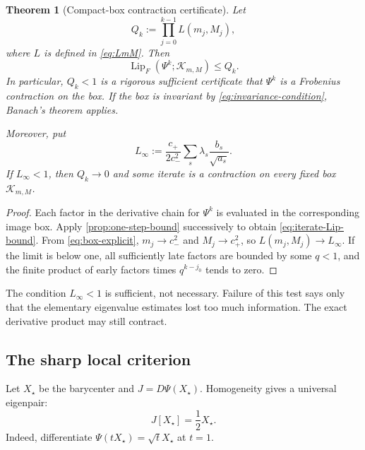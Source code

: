 \documentclass[11pt]{article}
\newtheorem{theorem}{Theorem}[section]
\theoremstyle{definition}
\newcommand{\Lip}{\operatorname{Lip}}
\newcommand{\cK}{\mathcal K}
\begin{document}
\begin{theorem}[Compact-box contraction certificate]\label{thm:compact-certificate}
Let
\begin{equation}\label{eq:Qk}
 Q_k:=\prod_{j=0}^{k-1}L(m_j,M_j),
\end{equation}
where $L$ is defined in \eqref{eq:LmM}.  Then
\begin{equation}\label{eq:iterate-Lip-bound}
 \Lip_F(\Psi^k;\cK_{m,M})\leq Q_k.
\end{equation}
In particular, $Q_k<1$ is a rigorous sufficient certificate that $\Psi^k$ is
a Frobenius contraction on the box.  If the box is invariant by
\eqref{eq:invariance-condition}, Banach's theorem applies.

Moreover, put
\begin{equation}\label{eq:L-infty}
 L_\infty:=
 \frac{c_+}{2c_-^2}
 \sum_s\lambda_s\frac{b_s}{\sqrt{a_s}}.
\end{equation}
If $L_\infty<1$, then $Q_k\to0$ and some iterate is a contraction on every
fixed box $\cK_{m,M}$.
\end{theorem}

\begin{proof}
Each factor in the derivative chain for $\Psi^k$ is evaluated in the
corresponding image box.  Apply \cref{prop:one-step-bound} successively to
obtain \eqref{eq:iterate-Lip-bound}.  From \eqref{eq:box-explicit},
$m_j\to c_-^2$ and $M_j\to c_+^2$, so
$L(m_j,M_j)\to L_\infty$.  If the limit is below one, all sufficiently late
factors are bounded by some $q<1$, and the finite product of early factors
times $q^{k-j_0}$ tends to zero.
\end{proof}

The condition $L_\infty<1$ is sufficient, not necessary.  Failure of this
test says only that the elementary eigenvalue estimates lost too much
information.  The exact derivative product may still contract.

\subsection{The sharp local criterion}

Let $X_\star$ be the barycenter and $J=D\Psi(X_\star)$.  Homogeneity gives a
universal eigenpair:
\begin{equation}\label{eq:radial-eigenpair}
 J[X_\star]=\frac12X_\star.
\end{equation}
Indeed, differentiate $\Psi(tX_\star)=\sqrt t X_\star$ at $t=1$.
\end{document}
